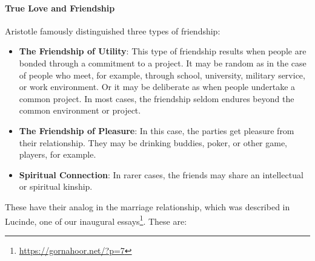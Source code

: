 \paragraph{True Love and Friendship}


Aristotle famously distinguished three types of friendship:

\begin{itemize}


\item \textbf{The Friendship of Utility}: This type of friendship results when people are bonded through a commitment to a project. It may be random as in the case of people who meet, for example, through school, university, military service, or work environment. Or it may be deliberate as when people undertake a common project. In most cases, the friendship seldom endures beyond the common environment or project.

\item \textbf{The Friendship of Pleasure}: In this case, the parties get pleasure from their relationship. They may be drinking buddies, poker, or other game, players, for example.

\item \textbf{Spiritual Connection}: In rarer cases, the friends may share an intellectual or spiritual kinship.
\end{itemize}


These have their analog in the marriage relationship, which was described in Lucinde, one of our inaugural essays\footnote{\url{https://gornahoor.net/?p=7}}. These are:

